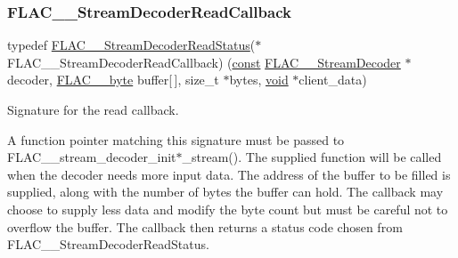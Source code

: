\subsubsection{\texorpdfstring{F\+L\+A\+C\+\_\+\+\_\+\+Stream\+Decoder\+Read\+Callback}{FLAC\_\_StreamDecoderReadCallback}}
{\footnotesize\ttfamily typedef \hyperlink{group__flac__stream__decoder_gad793ead451206c64a91dc0b851027b93}{F\+L\+A\+C\+\_\+\+\_\+\+Stream\+Decoder\+Read\+Status}($\ast$ F\+L\+A\+C\+\_\+\+\_\+\+Stream\+Decoder\+Read\+Callback) (\hyperlink{zconf_8h_a2c212835823e3c54a8ab6d95c652660e}{const} \hyperlink{struct_f_l_a_c_____stream_decoder}{F\+L\+A\+C\+\_\+\+\_\+\+Stream\+Decoder} $\ast$decoder, \hyperlink{ordinals_8h_a5eb569b12d5b047cdacada4d57924ee3}{F\+L\+A\+C\+\_\+\+\_\+byte} buffer\mbox{[}$\,$\mbox{]}, size\+\_\+t $\ast$bytes, \hyperlink{png_8h_ac9c84fa68bbad002983e35ce3663c686}{void} $\ast$client\+\_\+data)}

Signature for the read callback.

A function pointer matching this signature must be passed to F\+L\+A\+C\+\_\+\+\_\+stream\+\_\+decoder\+\_\+init$\ast$\+\_\+stream(). The supplied function will be called when the decoder needs more input data. The address of the buffer to be filled is supplied, along with the number of bytes the buffer can hold. The callback may choose to supply less data and modify the byte count but must be careful not to overflow the buffer. The callback then returns a status code chosen from F\+L\+A\+C\+\_\+\+\_\+\+Stream\+Decoder\+Read\+Status.


